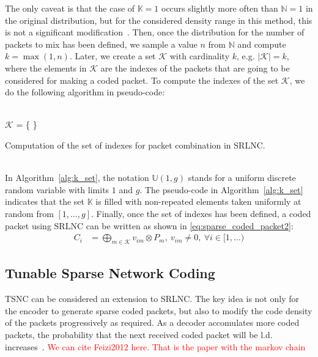 The only caveat is that the case of $\mathbb{K} = 1$ occurs slightly
more often than $\mathbb{N} = 1$ in the original distribution, but for
the considered density range in this method, this is not a significant
modification~\cite{practicalview_tsnc2015}. Then, once the
distribution for the number of packets to mix has been defined, we
sample a value $n$ from $\mathbb{N}$ and compute $k =
\max(1,n)$. Later, we create a set $\mathcal{K}$ with
cardinality $k$, e.g. $|\mathcal{K}| = k$, where the elements in
$\mathcal{K}$ are the indexes of the packets that are going to be
considered for making a coded packet. To compute the indexes
of the set $\mathcal{K}$, we do the following algorithm in pseudo-code: \\
\ \\
\begin{algorithm}[H]
 \label{alg:k_set}
 $\mathcal{K}$ = \{ \}\;
 \caption{Computation of the set of indexes for packet combination in SRLNC.}
\end{algorithm}
\ \\
In Algorithm~\ref{alg:k_set}, the notation $\mathbb{U}(1,g)$ stands
for a uniform discrete random variable with limits $1$ and $g$. The
pseudo-code in Algorithm~\ref{alg:k_set} indicates that the set $\mathbb{K}$
is filled with non-repeated elements taken uniformly at random from
$[1,\ldots,g]$. Finally, once the set of indexes has been defined, a coded
packet using \ac{SRLNC} can be written as shown in
\eqref{eq:sparse_coded_packet2}:
%
\begin{align} \label{eq:sparse_coded_packet2}
    C_i  &= \bigoplus_{m \in \mathcal{K}} v_{im} \otimes P_{m},\ v_{im} \neq 0,\ \forall i \in [1,\ldots)
\end{align}

\subsection{Tunable Sparse Network Coding}

\ac{TSNC} can be considered an extension to \ac{SRLNC}. The key idea is
not only for the encoder to generate sparse coded packets, but also to
modify the code density of the packets progressively as required. As a
decoder accomulates more coded packets, the probability that the next
received coded packet will be \ac{l.d.} increases~\cite{feizi2014tunable}.
\textcolor{red}{We can cite Feizi2012 here. That is the paper with the markov chain}

